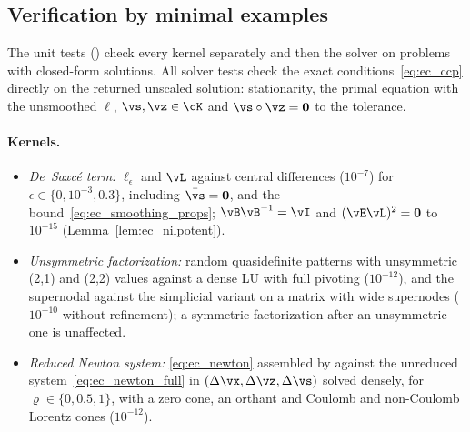 \subsection{Verification by minimal examples}\label{sec:ec_tests}
%
The unit tests () check every kernel separately and then the solver on problems with closed-form solutions. All solver tests check the exact conditions~\eqref{eq:ec_ccp} directly on the returned unscaled solution: stationarity, the primal equation with the unsmoothed $\ell$, $\vs, \vz \in \cK$ and $\vs\circ\vz = \mathbf{0}$ to the tolerance.
%
\paragraph{Kernels.}
%
\begin{itemize}
	\item \emph{De~Saxc\'e term:} $\ell_\epsilon$ and $\vL$ against central differences ($10^{-7}$) for $\epsilon \in \{0, 10^{-3}, 0.3\}$, including $\bar{\vs} = \mathbf{0}$, and the bound~\eqref{eq:ec_smoothing_props}; $\vB\vB^{-1} = \vI$ and $(\vE\vL)^2 = \mathbf{0}$ to $10^{-15}$ (Lemma~\ref{lem:ec_nilpotent}).
	\item \emph{Unsymmetric factorization:} random quasidefinite patterns with unsymmetric (2,1) and (2,2) values against a dense LU with full pivoting ($10^{-12}$), and the supernodal against the simplicial variant on a matrix with wide supernodes ($10^{-10}$ without refinement); a symmetric factorization after an unsymmetric one is unaffected.
	\item \emph{Reduced Newton system:} \eqref{eq:ec_newton} assembled by  against the unreduced system~\eqref{eq:ec_newton_full} in $(\Delta\vx, \Delta\vz, \Delta\vs)$ solved densely, for $\varrho \in \{0, 0.5, 1\}$, with a zero cone, an orthant and Coulomb and non-Coulomb Lorentz cones ($10^{-12}$).
\end{itemize}
%
